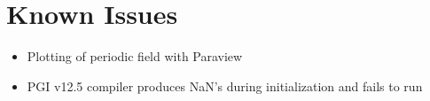 \chapter{Known Issues}
\label{chap:knownissues}

\begin{itemize}
\item{Plotting of periodic field with Paraview}
\item{PGI v12.5 compiler produces NaN's during initialization and fails to run}
\end{itemize}


